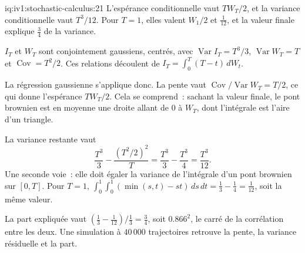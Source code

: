 \begin{solution}{iq:iv1:stochastic-calculus:21}
L'espérance conditionnelle vaut $TW_T/2$, et la variance conditionnelle vaut $T^3/12$. Pour $T = 1$, elles valent $W_1/2$ et $\frac{1}{12}$, et la valeur finale explique $\frac34$ de la variance.

$I_T$ et $W_T$ sont conjointement gaussiens, centrés, avec $\operatorname{Var}I_T = T^3/3$, $\operatorname{Var}W_T = T$ et $\operatorname{Cov} = T^2/2$. Ces relations découlent de $I_T = \int_0^T(T - t)\,dW_t$.

La régression gaussienne s'applique donc. La pente vaut $\operatorname{Cov}/\operatorname{Var}W_T = T/2$, ce qui donne l'espérance $TW_T/2$. Cela se comprend~: sachant la valeur finale, le pont brownien est en moyenne une droite allant de 0 à $W_T$, dont l'intégrale est l'aire d'un triangle.

La variance restante vaut
\[
\frac{T^3}{3} - \frac{(T^2/2)^2}{T} = \frac{T^3}{3} - \frac{T^3}{4} = \frac{T^3}{12}.
\]
Une seconde voie~: elle doit égaler la variance de l'intégrale d'un pont brownien sur $[0, T]$. Pour $T = 1$, $\int_0^1\int_0^1(\min(s, t) - st)\,ds\,dt = \frac13 - \frac14 = \frac{1}{12}$, soit la même valeur.

La part expliquée vaut $(\frac13 - \frac{1}{12})/\frac13 = \frac34$, soit $0.866^2$, le carré de la corrélation entre les deux. Une simulation à $40\,000$ trajectoires retrouve la pente, la variance résiduelle et la part.



\end{solution}

